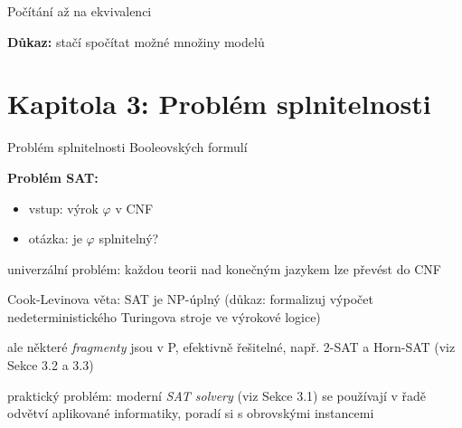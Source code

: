 \documentclass{beamer}
\begin{document}
\begin{frame}{Počítání až na ekvivalenci}


    \textbf{Důkaz:} stačí spočítat možné množiny modelů\hfill\qedsymbol
        
\end{frame}


\section{\sc Kapitola 3: Problém splnitelnosti}


\begin{frame}{Problém splnitelnosti Booleovských formulí}
   
    \textbf{Problém SAT:}
    \begin{itemize}
        \item vstup: výrok $\varphi$ v CNF
        \item otázka: je $\varphi$ splnitelný? 
    \end{itemize}

    \alert{univerzální problém}: každou teorii nad konečným jazykem lze převést do CNF

    \alert{Cook-Levinova věta}: SAT je NP-úplný (důkaz: formalizuj výpočet nedeterministického Turingova stroje ve výrokové logice)

    ale některé \emph{fragmenty} jsou v P, efektivně řešitelné, např. 2-SAT a Horn-SAT (viz Sekce 3.2 a 3.3)

    \alert{praktický problém}: moderní \emph{SAT solvery} (viz Sekce 3.1) se používají v řadě odvětví aplikované informatiky, poradí si s obrovskými instancemi
    
\end{frame}
\end{document}
